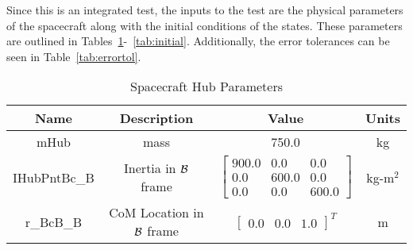 Since this is an integrated test, the inputs to the test are the physical parameters of the spacecraft along with the initial conditions of the states. These parameters are outlined in Tables~\ref{tab:hub}-~\ref{tab:initial}. Additionally, the error tolerances can be seen in Table~\ref{tab:errortol}.

\begin{table}[htbp]
	\caption{Spacecraft Hub Parameters}
	\label{tab:hub}
	\centering \fontsize{10}{10}\selectfont
	\begin{tabular}{| c | c | c | c |} %
		\hline
		\textbf{Name}  & \textbf{Description}  & \textbf{Value} & \textbf{Units} \\
		\hline
		mHub  & mass & 750.0 & kg \\
		\hline
		IHubPntBc\_B & Inertia in $\cal{B}$ frame & $\begin{bmatrix}
		900.0 & 0.0 & 0.0\\
		0.0 & 600.0 & 0.0\\
		0.0 & 0.0 & 600.0
		\end{bmatrix}$ & kg-m$^2$ \\
		\hline
		r\_BcB\_B & CoM Location in $\cal{B}$ frame & $\begin{bmatrix}
		0.0 & 0.0 & 1.0 \end{bmatrix}^T$ & m \\
		\hline
	\end{tabular}
\end{table}

